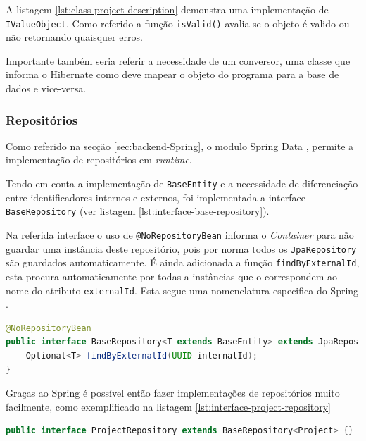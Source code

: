 A listagem \ref{lst:class-project-description} demonstra uma implementação de \lstinline|IValueObject|. Como referido a função \lstinline|isValid()| avalia se o objeto é valido ou não retornando quaisquer erros.

Importante também seria referir a necessidade de um conversor, uma classe que informa o \gls{Hibernate} como deve mapear o objeto do programa para a base de dados e vice-versa.







\subsubsection{Repositórios}

Como referido na secção \ref{sec:backend-Spring}, o modulo Spring Data , permite a implementação de repositórios em \textit{runtime}.

Tendo em conta a implementação de \lstinline|BaseEntity| e a necessidade de diferenciação entre identificadores internos e externos, foi implementada a interface \lstinline|BaseRepository| (ver listagem \ref{lst:interface-base-repository}). 

Na referida interface o uso de \lstinline|@NoRepositoryBean| informa o  \textit{Container} para não guardar uma instância deste repositório, pois por norma todos os \lstinline|JpaRepository| são guardados automaticamente. É ainda adicionada a função \lstinline|findByExternalId|, esta procura automaticamente por todas a instâncias que o correspondem ao nome do atributo \lstinline|externalId|. Esta segue uma nomenclatura especifica do Spring \cite{docs-spring-repository}.

\begin{lstlisting}[language=Java,caption={Inteface BaseRepository}, label={lst:interface-base-repository}]
@NoRepositoryBean
public interface BaseRepository<T extends BaseEntity> extends JpaRepository<T, UUID> {
    Optional<T> findByExternalId(UUID internalId);
}
\end{lstlisting}

Graças ao \gls{Spring} é possível então fazer implementações de repositórios muito facilmente, como exemplificado na listagem \ref{lst:interface-project-repository}

\begin{lstlisting}[language=Java, caption={interface \textit{ProjectRepository}}, label={lst:interface-project-repository}]
    public interface ProjectRepository extends BaseRepository<Project> {}
\end{lstlisting}







